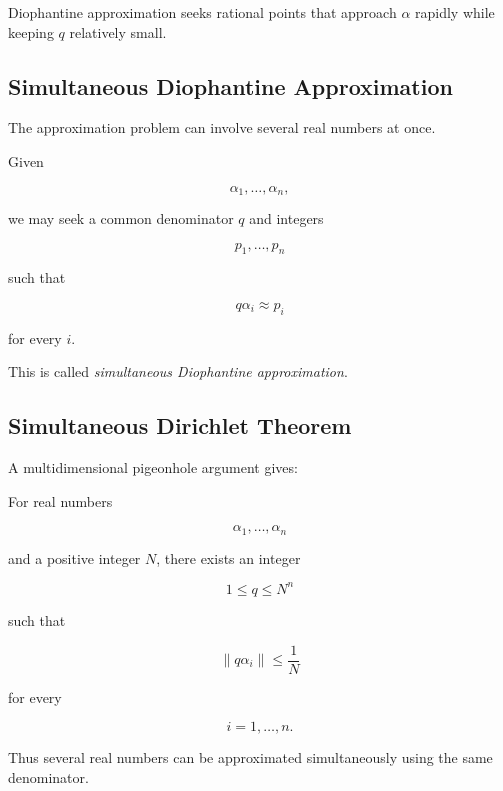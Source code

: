 Diophantine approximation seeks rational points that approach \(\alpha\)
rapidly while keeping \(q\) relatively small.

\subsection{Simultaneous Diophantine Approximation}
\label{subsec:simultaneous-diophantine-approximation}

The approximation problem can involve several real numbers at once.

Given

\[ \alpha_1,\ldots,\alpha_n, \]

we may seek a common denominator \(q\) and integers

\[ p_1,\ldots,p_n \]

such that

\[ q\alpha_i\approx p_i \]

for every \(i\).

This is called \emph{simultaneous Diophantine approximation}.

\subsection{Simultaneous Dirichlet Theorem}
\label{subsec:simultaneous-dirichlet}

A multidimensional pigeonhole argument gives:

\begin{theorem}
For real numbers

\[ \alpha_1,\ldots,\alpha_n \]

and a positive integer \(N\), there exists an integer

\[ 1\leq q\leq N^n \]

such that

\[ \boxed{\|q\alpha_i\|\leq\frac1N} \]

for every

\[ i=1,\ldots,n. \]
\end{theorem}

Thus several real numbers can be approximated simultaneously using the same
denominator.


